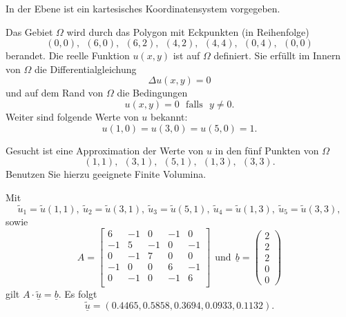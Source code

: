 In der Ebene ist ein kartesisches Koordinatensystem vorgegeben.

Das Gebiet $\Omega$ wird durch das Polygon mit Eckpunkten (in Reihenfolge)
\[
(0,0), \ \ (6,0), \ \ (6,2), \ \ (4,2),  \ \ (4,4),  \ \ (0,4), \ \  (0,0)
\]
berandet. Die reelle Funktion $u(x,y)$ ist auf $\Omega$ definiert.
Sie erfüllt im Innern von $\Omega$ die Differentialgleichung
\[
\Delta u(x,y) = 0
\]
und auf dem Rand von $\Omega$ die Bedingungen
\[
u(x,y) = 0 \ \ \ \mbox{falls} \ \ \ y \neq 0.
\]
Weiter sind folgende Werte von $u$ bekannt:
\[
u(1,0) = u(3,0) = u(5,0) = 1.
\]

\vspace{1mm}

Gesucht ist eine Approximation der Werte von $u$ in den fünf Punkten
von $\Omega$
\[
(1,1), \ \  (3,1), \ \ (5,1), \ \  (1,3), \ \ (3,3).
\]
Benutzen Sie hierzu geeignete Finite Volumina.


\begin{loesung}
Mit
\[
\tilde u_1 = \tilde u(1,1), \ \tilde u_2 = \tilde u(3,1), \ \tilde u_3 = \tilde u(5,1), \ \tilde u_4 = \tilde u(1,3), \ \tilde u_5 = \tilde u(3,3),
\]
sowie
\[
A = \left[\begin{array}{rrrrr} 
6 & -1 & 0 & -1 & 0 \\
-1 & 5 & -1 & 0 & -1 \\
0 & -1 & 7 & 0 & 0 \\ 
-1 & 0 & 0 & 6 & -1 \\
0 & -1 & 0 & -1 & 6 \\
 \end{array}\right] \ \ \mbox{und} \ \
\underline{b} =  \left(\begin{array}{r} 2 \\ 2 \\ 2 \\ 0 \\ 0 \end{array}\right)
\]
gilt $A \cdot \underline{\tilde u} = \underline{b}.$
Es folgt
\[
\underline{\tilde u} = (0.4465, 0.5858, 0.3694, 0.0933, 0.1132).
\]
\end{loesung}
